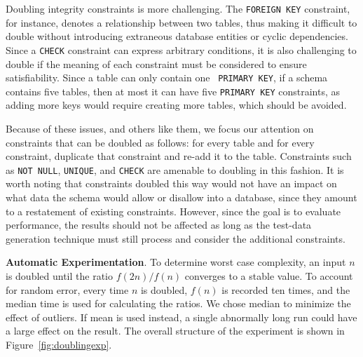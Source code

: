 

  Doubling integrity constraints is more challenging.  The {\tt FOREIGN KEY} constraint, for instance, denotes a relationship
  between two tables, thus making it difficult to double without introducing extraneous database entities or cyclic
  dependencies.  Since a {\tt CHECK} constraint can express arbitrary conditions, it is also challenging to double if the
  meaning of each constraint must be considered to ensure satisfiability.  Since a table can only contain one {\tt
  PRIMARY KEY}, if a schema contains five tables, then at most it can have five {\tt PRIMARY KEY} constraints, as adding more
  keys would require creating more tables, which should be avoided.




  Because of these issues, and others like them, we focus our attention on constraints that can be doubled as follows:
  for every table and for every constraint, duplicate that constraint and re-add it to the table.  Constraints such as
  {\tt NOT NULL}, {\tt UNIQUE}, and {\tt CHECK} are amenable to doubling in this fashion.  It is worth noting that
  constraints doubled this way would not have an impact on what data the schema would allow or disallow into a database,
  since they amount to a restatement of existing constraints.  However, since the goal is to evaluate performance, the
  results should not be affected as long as the test-data generation technique must still process and consider the
  additional constraints.

  \textbf{Automatic Experimentation}. To determine worst case complexity, an input $n$ is doubled until the ratio $f(2n)
  / f(n)$ converges to a stable value.  To account for random error, every time $n$ is doubled, $f(n)$ is recorded ten
  times, and the median time is used for calculating the ratios.  We chose median to minimize the effect of outliers. If
  mean is used instead, a single abnormally long run could have a large effect on the result. The overall structure of
  the experiment is shown in Figure~\ref{fig:doublingexp}.

